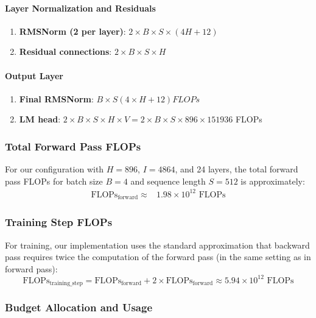 \documentclass{article}
\begin{document}
\paragraph{Layer Normalization and Residuals}
\begin{enumerate}
    \item \textbf{RMSNorm (2 per layer)}: $2 \times B\times S \times (4H + 12)$
    \item \textbf{Residual connections}: $2 \times B\times S \times H$
\end{enumerate}

\paragraph{Output Layer}
\begin{enumerate}
    \item \textbf{Final RMSNorm}: $ B \times S (4 \times H+12) FLOPs$
    \item \textbf{LM head}: $2 \times B \times S \times H \times V = 2 \times B \times S \times 896 \times 151936$ FLOPs
\end{enumerate}

\subsubsection*{Total Forward Pass FLOPs}

For our configuration with $H=896$, $I=4864$, and 24 layers, the total forward pass FLOPs for batch size $B=4$ and sequence length $S=512$ is approximately:
\begin{align}
\text{FLOPs}_{\text{forward}} \approx & 1.98 \times 10^{12} \text{ FLOPs} 
\end{align}

\subsubsection*{Training Step FLOPs}

For training, our implementation uses the standard approximation that backward pass requires twice the computation of the forward pass (in the same setting as in forward pass):
\begin{equation}
\text{FLOPs}_{\text{training\_step}} = \text{FLOPs}_{\text{forward}} + 2 \times \text{FLOPs}_{\text{forward}} \approx 5.94 \times 10^{12} \text{ FLOPs}
\end{equation}

\subsubsection*{Budget Allocation and Usage}
\end{document}

